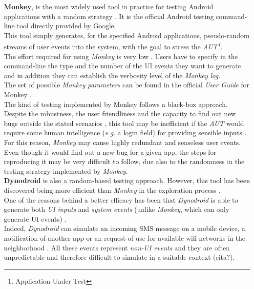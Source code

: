 \textbf{Monkey}, is the most widely used tool in practice for testing Android applications with a random strategy \cite{monkey}. It is the official Android testing command-line tool directly provided by Google. \\
This tool simply generates, for the specified Android applications, pseudo-random streams of user events into the system, with the goal to stress the \textit{AUT\footnote{Application Under Test}}\cite{monkey}. \\ 
The effort required for using \textit{Monkey} is very low \cite{areWeThereYet}. Users have to specify in the command-line the type and the number of the UI events they want to generate and in addition they can establish the verbosity level of the \textit{Monkey log}. \\
The set of possible \textit{Monkey parameters} can be found in the official \textit{User Guide} for Monkey \cite{monkey}. \\
The kind of testing implemented by Monkey follows a black-box approach. 
Despite the robustness, the user friendliness \cite{areWeThereYet, dynodroid} and the capacity to find out new bugs outside the stated scenarios  \cite{monkey_2}, this tool may be inefficient if the \textit{AUT} would require some human intelligence (\textit{e.g.} a login field) for providing sensible inputs \cite{dynodroid}. \\
For this reason, \textit{Monkey} may cause highly redundant and senseless user events. Even though it would find out a new bug for a given app, the steps for reproducing it may be very difficult to follow, due also to the randomness in the testing strategy implemented by \textit{Monkey}\cite{monkey_2}. \\
\textbf{Dynodroid} \cite{dynodroid} is also a random-based testing approach. However, this tool has been discovered being more efficient than \textit{Monkey} in the exploration process  \cite{areWeThereYet}. \\
One of the reasons behind a better efficacy has been that \textit{Dynodroid} is able to generate both \textit{UI inputs} and \textit{system events} (unlike \textit{Monkey}, which can only generate UI events) \cite{areWeThereYet}. \\  
Indeed, \textit{Dynodroid} can simulate an incoming SMS message on a mobile device, a notification of another app or an request of use for available wifi networks in the neighborhood \cite{dynodroid}. All these events represent \textit{non-UI events} and they are often unpredictable and therefore difficult to simulate in a suitable context (cita?). \\
